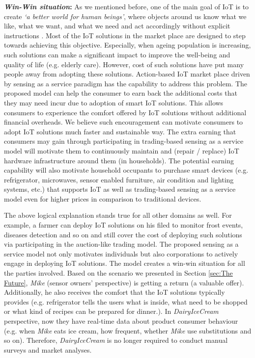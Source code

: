 \documentclass[conference]{IEEEtran}
\begin{document}
 \textbf{\textit{Win-Win situation}:} As we mentioned before, one of the main goal of IoT is to create \textit{`a better world for human beings'}, where objects around us know what we like, what we want, and what we need and act accordingly without explicit instructions \cite{P040}. Most of the IoT solutions \cite{P596} in the market place are designed to step towards achieving this objective. Especially, when ageing population is increasing, such solutions can make a significant impact to improve the well-being and quality of life (e.g. elderly care). However, cost of such solutions have put many people away from adopting these solutions. Action-based IoT market place driven by sensing as a service paradigm has the capability to address this problem. The proposed model can help the consumer to earn back the additional costs that they may need incur due to adoption of smart IoT solutions. This allows consumers to experience the comfort offered by IoT solutions without additional financial overheads. We believe such encouragement can motivate consumers to adopt IoT solutions much faster and sustainable way. The extra earning that consumers  may gain through participating in trading-based sensing as a service model will motivate them to continuously maintain and (repair / replace) IoT hardware infrastructure around them (in households). The potential earning capability will also motivate household occupants to purchase smart  devices (e.g. refrigerator, microwaves, sensor enabled furniture, air condition and lighting systems, etc.) that supports IoT as well as trading-based sensing as a service model even for higher prices in comparison to traditional devices.


The above logical explanation stands true for all other domains as well. For example, a farmer can deploy IoT solutions on his filed to monitor frost events, diseases detection and so on and still cover the cost of deploying such solutions via participating in the auction-like trading model. The proposed sensing as a service model not only motivates individuals but also corporations to actively engage  in deploying IoT solutions. The model creates a win-win situation for all the parties involved. Based on the scenario we presented in Section \ref{sec:The Future}, \textit{Mike} (sensor owners' perspective) is getting a return (a valuable offer). Additionally, he also receives the comfort that the IoT solutions typically provides (e.g. refrigerator tells the users what is inside, what need to be shopped or what kind of recipes can be prepared for dinner.). In \textit{DairyIceCream}  perspective, now they have real-time data about product consumer behaviour (e.g. when \textit{Mike} eats ice cream, how frequent, whether \textit{Mike} use substitutions and so on). Therefore, \textit{DairyIceCream} is no longer required to conduct manual surveys and market analyses.
\end{document}
